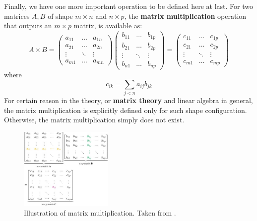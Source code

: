 Finally, we have one more important operation to be defined here at last. For two matrices $A,B$ of shape $m\times n$ and $n\times p$, the \textbf{matrix multiplication} operation that outputs an $m\times p$ matrix, is available as: 
\begin{equation}
    A\times B = \begin{pmatrix}
        a_{11} & \dots & a_{1n} \\
        a_{21} & \dots & a_{2n} \\
        \vdots & \ddots & \vdots \\
        a_{m1} & \dots & a_{mn}
    \end{pmatrix}
    \begin{pmatrix}
        b_{11} & \dots & b_{1p} \\
        b_{21} & \dots & b_{2p} \\
        \vdots & \ddots & \vdots \\
        b_{n1} & \dots & b_{np}
    \end{pmatrix} = 
    \begin{pmatrix}
        c_{11} & \dots & c_{1p} \\
        c_{21} & \dots & c_{2p} \\
        \vdots & \ddots & \vdots \\
        c_{m1} & \dots & c_{mp}
    \end{pmatrix}
\end{equation}
where \begin{equation}
    c_{ik} = \sum_{j<n} a_{ij}b_{jk}
\end{equation}
For certain reason in the theory, or \textbf{matrix theory} and linear algebra in general, the matrix multiplication is explicitly defined only for such shape configuration. Otherwise, the matrix multiplication simply does not exist.
\begin{figure}[htb]
    \centering
    \includegraphics[width=0.4\textwidth]{img/jjgh.jpg}
    \caption{Illustration of matrix multiplication. Taken from \cite{ANDRILLI20101}.}
    \label{fig:matmuls}
\end{figure}
